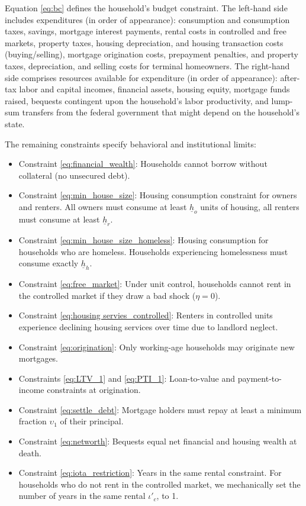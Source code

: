 \documentclass[parskip=full]{article}
\begin{document}
Equation \eqref{eq:bc} defines the household's budget constraint. The left-hand side includes expenditures (in order of appearance): consumption and consumption taxes, savings, mortgage interest payments, rental costs in controlled and free markets, property taxes, housing depreciation, and housing transaction costs (buying/selling), mortgage origination costs, prepayment penalties, and property taxes, depreciation, and selling costs for terminal homeowners. The right-hand side comprises resources available for expenditure (in order of appearance): after-tax labor and capital incomes, financial assets, housing equity, mortgage funds raised, bequests contingent upon the household's labor productivity, and lump-sum transfers from the federal government that might depend on the household's state. 

The remaining constraints specify behavioral and institutional limits: 
\begin{itemize}
    \item Constraint \eqref{eq:financial_wealth}: Households cannot borrow without collateral (no unsecured debt).
    \item Constraint \eqref{eq:min_house_size}: Housing consumption constraint for owners and renters. All owners must consume at least $\underline{h}_{o}$ units of housing, all renters must consume at least $\underline{h}_{r}$.
    \item Constraint \eqref{eq:min_house_size_homeless}: Housing consumption for households who are homeless. Households experiencing homelessness must consume exactly $\underline{h}_{h}$.
    \item Constraint \eqref{eq:free_market}: Under unit control, households cannot rent in the controlled market if they draw a bad shock ($\eta=0$).
    \item Constraint \eqref{eq:housing servies_controlled}: Renters in controlled units experience declining housing services over time due to landlord neglect. 
    \item Constraint \eqref{eq:origination}: Only working-age households may originate new mortgages.
    \item Constraints \eqref{eq:LTV_1} and \eqref{eq:PTI_1}: Loan-to-value and payment-to-income constraints at origination.
    \item Constraint \eqref{eq:settle_debt}: Mortgage holders must repay at least a minimum fraction $\upsilon_{1}$ of their principal.
    \item Constraint \eqref{eq:networth}: Bequests equal net financial and housing wealth at death.
    \item Constraint \eqref{eq:iota_restriction}: Years in the same rental constraint. For households who do not rent in the controlled market, we mechanically set the number of years in the same rental $\iota'_{c}$, to 1.
\end{itemize} 
\end{document}
